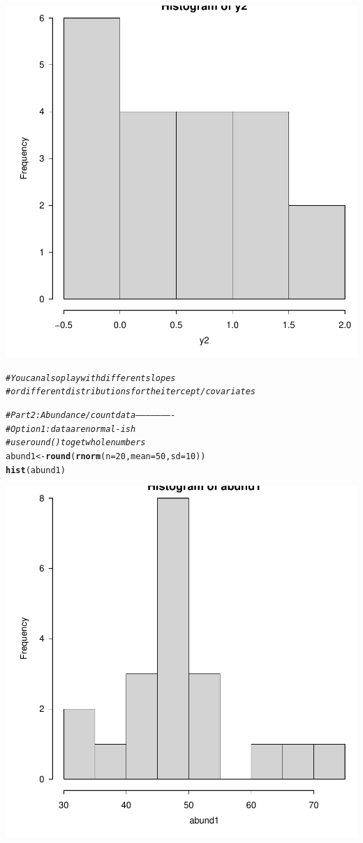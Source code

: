 \documentclass{article}\usepackage[]{graphicx}\usepackage[]{color}
\makeatletter
\newcommand{\hlnum}[1]{\textcolor[rgb]{0.686,0.059,0.569}{#1}}%
\newcommand{\hlcom}[1]{\textcolor[rgb]{0.678,0.584,0.686}{\textit{#1}}}%
\newcommand{\hlstd}[1]{\textcolor[rgb]{0.345,0.345,0.345}{#1}}%
\newcommand{\hlkwb}[1]{\textcolor[rgb]{0.69,0.353,0.396}{#1}}%
\newcommand{\hlkwc}[1]{\textcolor[rgb]{0.333,0.667,0.333}{#1}}%
\newcommand{\hlkwd}[1]{\textcolor[rgb]{0.737,0.353,0.396}{\textbf{#1}}}%
\newenvironment{kframe}{%
 \def\at@end@of@kframe{}%
 \ifinner\ifhmode%
  \def\at@end@of@kframe{\end{minipage}}%
  \begin{minipage}{\columnwidth}%
 \fi\fi%
 \def\FrameCommand##1{\hskip\@totalleftmargin \hskip-\fboxsep
 \colorbox{shadecolor}{##1}\hskip-\fboxsep
     \hskip-\linewidth \hskip-\@totalleftmargin \hskip\columnwidth}%
 \MakeFramed {\advance\hsize-\width
   \@totalleftmargin\z@ \linewidth\hsize
   \@setminipage}}%
 {\par\unskip\endMakeFramed%
 \at@end@of@kframe}
\newenvironment{knitrout}{}{} %
\makeatother
\begin{document}
\begin{knitrout}
{\centering \includegraphics[width=.6\linewidth]{figure/Tutorial08-datasims-S2022-Rnwauto-report-5} 

}


\begin{kframe}\begin{alltt}
\hlcom{# You can also play with different slopes}
\hlcom{# or different distributions for the itercept/covariates}

\hlcom{# Part 2: Abundance/count data ----------------------}
\hlcom{# Option 1: data are normal-ish}
\hlcom{# use round() to get whole numbers}
\hlstd{abund1} \hlkwb{<-} \hlkwd{round}\hlstd{(}\hlkwd{rnorm}\hlstd{(}\hlkwc{n} \hlstd{=} \hlnum{20}\hlstd{,} \hlkwc{mean} \hlstd{=} \hlnum{50}\hlstd{,} \hlkwc{sd} \hlstd{=} \hlnum{10}\hlstd{))}
\hlkwd{hist}\hlstd{(abund1)}
\end{alltt}
\end{kframe}

{\centering \includegraphics[width=.6\linewidth]{figure/Tutorial08-datasims-S2022-Rnwauto-report-6} 

}
\end{knitrout}
\end{document}

